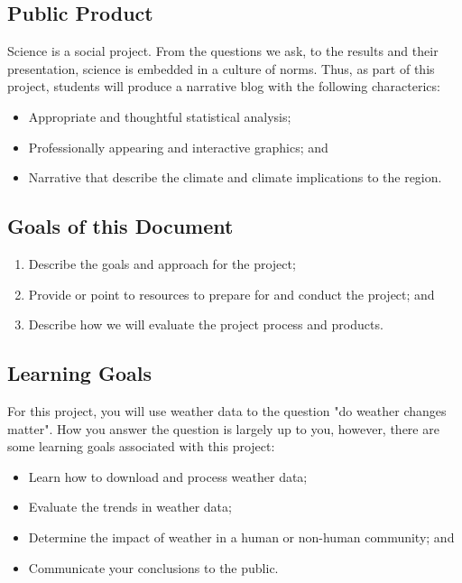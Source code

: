 \documentclass{article}\usepackage[]{graphicx}\usepackage[]{color}
\begin{document}
\subsection{Public Product}

Science is a social project. From the questions we ask, to the results and their presentation, science is embedded in a culture of norms. Thus, as part of this project, students will produce a narrative blog with the following characterics:

\begin{itemize}
  \item Appropriate and thoughtful statistical analysis;
  \item Professionally appearing and interactive graphics; and 
  \item Narrative that describe the climate and climate implications to the region.
\end{itemize}


\subsection{Goals of this Document}

\begin{enumerate}
  \item Describe the goals and approach for the project;
  \item Provide or point to resources to prepare for and conduct the project; and
  \item Describe how we will evaluate the project process and products.
\end{enumerate}

\subsection{Learning Goals}

For this project, you will use weather data to the question "do weather changes matter". How you answer the question is largely up to you, however, there are some learning goals associated with this project:

\begin{itemize}
  \item Learn how to download and process weather data;
  \item Evaluate the trends in weather data;
  \item Determine the impact of weather in a human or non-human community; and
  \item Communicate your conclusions to the public.
\end{itemize}
\end{document}
